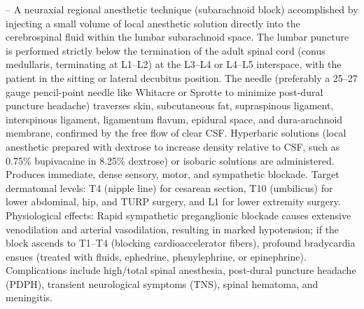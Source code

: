 -- A neuraxial regional anesthetic technique (subarachnoid block) accomplished by injecting a small volume of local anesthetic solution directly into the cerebrospinal fluid within the lumbar subarachnoid space. The lumbar puncture is performed strictly below the termination of the adult spinal cord (conus medullaris, terminating at L1--L2) at the L3--L4 or L4--L5 interspace, with the patient in the sitting or lateral decubitus position. The needle (preferably a 25--27 gauge pencil-point needle like Whitacre or Sprotte to minimize post-dural puncture headache) traverses skin, subcutaneous fat, supraspinous ligament, interspinous ligament, ligamentum flavum, epidural space, and dura-arachnoid membrane, confirmed by the free flow of clear CSF. Hyperbaric solutions (local anesthetic prepared with dextrose to increase density relative to CSF, such as 0.75\% bupivacaine in 8.25\% dextrose) or isobaric solutions are administered. Produces immediate, dense sensory, motor, and sympathetic blockade. Target dermatomal levels: T4 (nipple line) for cesarean section, T10 (umbilicus) for lower abdominal, hip, and TURP surgery, and L1 for lower extremity surgery. Physiological effects: Rapid sympathetic preganglionic blockade causes extensive venodilation and arterial vasodilation, resulting in marked hypotension; if the block ascends to T1--T4 (blocking cardioaccelerator fibers), profound bradycardia ensues (treated with fluids, ephedrine, phenylephrine, or epinephrine). Complications include high/total spinal anesthesia, post-dural puncture headache (PDPH), transient neurological symptoms (TNS), spinal hematoma, and meningitis.

